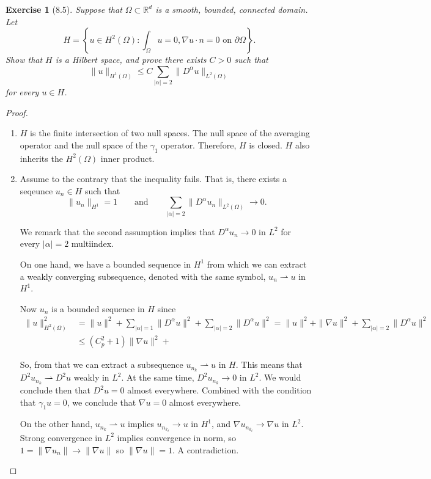 \documentclass[letterpaper,twoside,11pt]{article}
\theoremstyle{mystyle}
\newtheorem*{exercise}{Exercise}
\newcommand{\R}{{\mathbb R}}
\newcommand{\cbk}{\color{black}}
\newcommand{\cred}{\color{red}}
\begin{document}
\newpage
\begin{exercise}[8.5]
  Suppose that $\Omega \subset \R^d$ is a smooth, bounded, connected domain. Let 
  \[H = \left\{ u \in H^2 \left( \Omega \right)  : \int_\Omega u = 0, \nabla u \cdot n = 0 \text{ on } \partial \Omega  \right\}.\]
  Show that $H$ is a Hilbert space, and prove there exists $C > 0$ such that 
  \[\|u\|_{H^1 \left( \Omega \right) } \leq C \sum_{|\alpha| = 2} \|D^\alpha u \|_{L^2 (\Omega)}\]
  for every $u \in H$. 
\end{exercise}

\begin{proof}
  \begin{enumerate}
    \item $H$ is the finite intersection of two null spaces. The null space of the averaging operator and the null space of the $\gamma_1$ operator. Therefore, $H$ is closed. $H$ also inherits the $H^2 \left( \Omega \right)$ inner product. 
    \item Assume to the contrary that the inequality fails. That is, there exists a seqeunce $u_n \in H$ such that 
    \[\|u_n\|_{H^1} = 1 \qquad \text{and} \qquad \sum_{|\alpha| = 2} \|D^\alpha u_n \|_{L^2 (\Omega)} \to 0 . \]

    We remark that the second assumption implies that $D^\alpha u_n \to 0$ in $L^2$ for every $|\alpha| = 2$ multiindex.

    On one hand, we have a bounded sequence in $H^1$ from which we can extract a weakly converging subsequence, denoted with the same symbol, $u_n \rightharpoonup u$ in $H^1$. 
    
    \cred

    
    Now $u_n$ is a bounded sequence in $H$ since
    \begin{align*}
      \|u\|_{H^2(\Omega)}^2 &= \|u\|^2 + \sum_{|\alpha| = 1} \|D^\alpha u \|^2 + \sum_{|\alpha| = 2} \|D^\alpha u \|^2 = \|u\|^2 + \|\nabla u \|^2 + \sum_{|\alpha| = 2} \|D^\alpha u \|^2 \\ 
      &\leq \left( C_p^2 + 1  \right) \|\nabla u\|^2 +
    \end{align*}

    So, from that we can extract a subsequence $u_{n_k} \rightharpoonup u$ in $H$. This means that $D^2 u_{n_k} \rightharpoonup D^2 u$ weakly in $L^2$. At the same time, $D^2 u_{n_k} \to 0$ in $L^2$. We would conclude then that $D^2 u = 0$ almost everywhere. Combined with the condition that $\gamma_1 u = 0$, we conclude that $\nabla u = 0$ almost everywhere. 


    On the other hand, $u_{n_k} \rightharpoonup u$ implies $u_{n_{k_\ell}} \to u$ in $H^1$, and $\nabla u_{n_{k_\ell}} \to \nabla u$ in $L^2$. Strong convergence in $L^2$ implies convergence in norm, so $1=\|\nabla u_n\| \to \|\nabla u\| $ so $\|\nabla u \| = 1$. A contradiction. 

    \cbk 

  \end{enumerate}
\end{proof}
\end{document}
